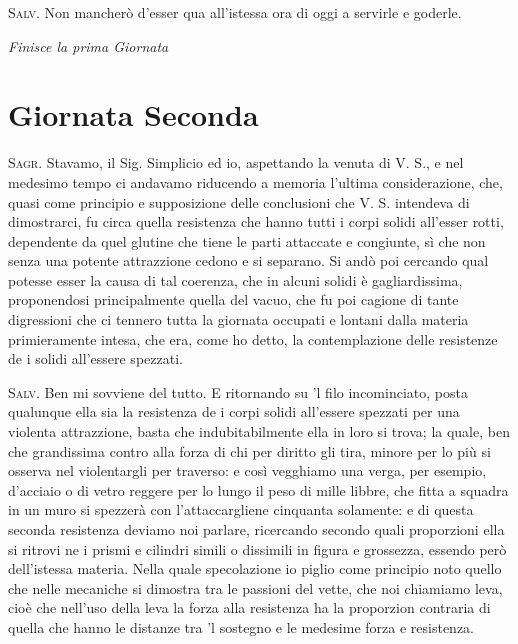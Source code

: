 \documentclass[11pt,twoside,openany]{book}
\newcommand{\speaker}[1]{\textcolor{rubric}{\textsc{#1}}\space}
\begin{document}
\speaker{Salv.} Non mancherò d'esser qua all'istessa ora di oggi a servirle e goderle.


\vspace{1.5em}\begin{center}\large\itshape Finisce la prima Giornata\end{center}

\chapter*{Giornata Seconda}
\speaker{Sagr.} Stavamo, il Sig. Simplicio ed io, aspettando la venuta di V. S., e nel medesimo tempo ci andavamo riducendo a memoria l'ultima considerazione, che, quasi come principio e supposizione delle conclusioni che V. S. intendeva di dimostrarci, fu circa quella resistenza che hanno tutti i corpi solidi all'esser rotti, dependente da quel glutine che tiene le parti attaccate e congiunte, sì che non senza una potente attrazzione cedono e si separano. Si andò poi cercando qual potesse esser la causa di tal coerenza, che in alcuni solidi è gagliardissima, proponendosi principalmente quella del vacuo, che fu poi cagione di tante digressioni che ci tennero tutta la giornata occupati e lontani dalla materia primieramente intesa, che era, come ho detto, la contemplazione delle resistenze de i solidi all'essere spezzati.

\speaker{Salv.} Ben mi sovviene del tutto. E ritornando su 'l filo incominciato, posta qualunque ella sia la resistenza de i corpi solidi all'essere spezzati per una violenta attrazzione, basta che indubitabilmente ella in loro si trova; la quale, ben che grandissima contro alla forza di chi per diritto gli tira, minore per lo più si osserva nel violentargli per traverso: e così vegghiamo una verga, per esempio, d'acciaio o di vetro reggere per lo lungo il peso di mille libbre, che fitta a squadra in un muro si spezzerà con l'attaccargliene cinquanta solamente: e di questa seconda resistenza deviamo noi parlare, ricercando secondo quali proporzioni ella si ritrovi ne i prismi e cilindri simili o dissimili in figura e grossezza, essendo però dell'istessa materia. Nella quale specolazione io piglio come principio noto quello che nelle mecaniche si dimostra tra le passioni del vette, che noi chiamiamo leva, cioè che nell'uso della leva la forza alla resistenza ha la proporzion contraria di quella che hanno le distanze tra 'l sostegno e le medesime forza e resistenza.
\end{document}
